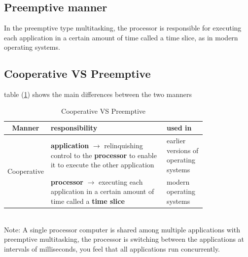 \documentclass[12pt, a4paper]{book}
\begin{document}
\subsection{Preemptive manner}
In the preemptive type multitasking, the processor is responsible for executing each application in a certain amount of time called a time slice, as in modern operating systems.
\subsection{Cooperative VS Preemptive}
table (\ref{tab:cooperativeVsPreemptive}) shows the main differences between the two manners\\
\begin{table}[!ht]
    \centering
    \begin{tabular}{|c|p{0.6\linewidth}|p{0.20\linewidth}|}
        \hline
        Manner                       & responsibility                                                                                                                   & used in                               \\
        \hline
        \multirow{2}{*}{Cooperative} & \textbf{application} $\rightarrow$ relinquishing control to the \textbf{processor} to enable it to execute the other application & earlier versions of operating systems \\
        \hline
        \multirow{2}{*}{Preemptive}  & \textbf{processor} $\rightarrow$ executing each application in a certain amount of time called a  \textbf{time slice}            & modern operating systems              \\
        \hline
    \end{tabular}
    \label{tab:cooperativeVsPreemptive}
    \caption{Cooperative VS Preemptive}
\end{table}
\\
Note: A single processor computer is shared among multiple applications with preemptive multitasking, the processor is switching between the applications at intervals of milliseconds, you feel that all applications run concurrently.
\end{document}
